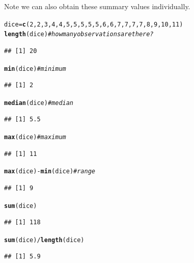\documentclass[12pt]{article}\usepackage[]{graphicx}\usepackage[]{color}
\makeatletter
\newcommand{\hlnum}[1]{\textcolor[rgb]{0.686,0.059,0.569}{#1}}%
\newcommand{\hlcom}[1]{\textcolor[rgb]{0.678,0.584,0.686}{\textit{#1}}}%
\newcommand{\hlopt}[1]{\textcolor[rgb]{0,0,0}{#1}}%
\newcommand{\hlstd}[1]{\textcolor[rgb]{0.345,0.345,0.345}{#1}}%
\newcommand{\hlkwb}[1]{\textcolor[rgb]{0.69,0.353,0.396}{#1}}%
\newcommand{\hlkwd}[1]{\textcolor[rgb]{0.737,0.353,0.396}{\textbf{#1}}}%
\newenvironment{kframe}{%
 \def\at@end@of@kframe{}%
 \ifinner\ifhmode%
  \def\at@end@of@kframe{\end{minipage}}%
  \begin{minipage}{\columnwidth}%
 \fi\fi%
 \def\FrameCommand##1{\hskip\@totalleftmargin \hskip-\fboxsep
 \colorbox{shadecolor}{##1}\hskip-\fboxsep
     \hskip-\linewidth \hskip-\@totalleftmargin \hskip\columnwidth}%
 \MakeFramed {\advance\hsize-\width
   \@totalleftmargin\z@ \linewidth\hsize
   \@setminipage}}%
 {\par\unskip\endMakeFramed%
 \at@end@of@kframe}
\newenvironment{knitrout}{}{} %
\makeatother
\begin{document}
Note we can also obtain these summary values individually.
\begin{knitrout}
\color{fgcolor}\begin{kframe}
\begin{alltt}
\hlstd{dice} \hlkwb{=} \hlkwd{c}\hlstd{(}\hlnum{2}\hlstd{,} \hlnum{2}\hlstd{,} \hlnum{3}\hlstd{,} \hlnum{4}\hlstd{,} \hlnum{4}\hlstd{,} \hlnum{5}\hlstd{,} \hlnum{5}\hlstd{,} \hlnum{5}\hlstd{,} \hlnum{5}\hlstd{,} \hlnum{5}\hlstd{,} \hlnum{6}\hlstd{,} \hlnum{6}\hlstd{,} \hlnum{7}\hlstd{,} \hlnum{7}\hlstd{,} \hlnum{7}\hlstd{,} \hlnum{7}\hlstd{,} \hlnum{8}\hlstd{,} \hlnum{9}\hlstd{,} \hlnum{10}\hlstd{,} \hlnum{11}\hlstd{)}
\hlkwd{length}\hlstd{(dice)}  \hlcom{#how many observations are there?}
\end{alltt}
\begin{verbatim}
## [1] 20
\end{verbatim}
\begin{alltt}
\hlkwd{min}\hlstd{(dice)}  \hlcom{#minimum}
\end{alltt}
\begin{verbatim}
## [1] 2
\end{verbatim}
\begin{alltt}
\hlkwd{median}\hlstd{(dice)}  \hlcom{#median}
\end{alltt}
\begin{verbatim}
## [1] 5.5
\end{verbatim}
\begin{alltt}
\hlkwd{max}\hlstd{(dice)}  \hlcom{#maximum}
\end{alltt}
\begin{verbatim}
## [1] 11
\end{verbatim}
\begin{alltt}
\hlkwd{max}\hlstd{(dice)} \hlopt{-} \hlkwd{min}\hlstd{(dice)}  \hlcom{#range}
\end{alltt}
\begin{verbatim}
## [1] 9
\end{verbatim}
\begin{alltt}
\hlkwd{sum}\hlstd{(dice)}
\end{alltt}
\begin{verbatim}
## [1] 118
\end{verbatim}
\begin{alltt}
\hlkwd{sum}\hlstd{(dice)}\hlopt{/}\hlkwd{length}\hlstd{(dice)}
\end{alltt}
\begin{verbatim}
## [1] 5.9
\end{verbatim}

\end{kframe}
\end{knitrout}
\end{document}
